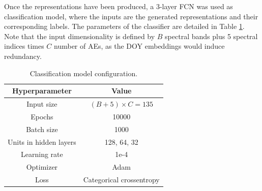 \documentclass[journal,article,submit,pdftex,moreauthors]{Definitions/mdpi}
\begin{document}
Once the representations have been produced, a 3-layer FCN was used as classification model, where the inputs are the generated representations and their corresponding labels. The parameters of the classifier are detailed in Table \ref{fcn_hyperparameters}.
Note that the input dimensionality is defined by $B$ spectral bands plus 5 spectral indices times $C$ number of AEs, as the DOY embeddings would induce redundancy.
\begin{table}[H]
	\centering
	\caption{Classification model configuration.}
	\begin{tabular}{c|c}
	\hline
		Hyperparameter & Value \\ \hline
		Input size & $(B + 5) \times C = 135$ \\
		Epochs & 10000 \\ 
		Batch size & 1000\\ 
		Units in hidden layers & 128, 64, 32 \\  
		Learning rate & 1e-4 \\
		Optimizer & Adam \\ 
		Loss & Categorical crossentropy \\ \hline
	\end{tabular}
	\label{fcn_hyperparameters}
\end{table}

\end{document}
